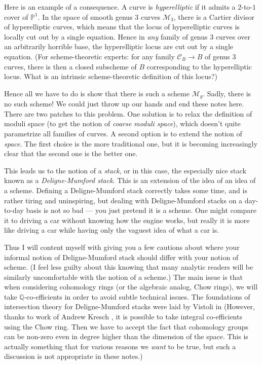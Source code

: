 \documentclass[12pt,letterpaper]{amsart}
\newcommand{\Q}{\mathbb{Q}}
\newcommand{\proj}{\mathbb P}
\newcommand{\cC}{{\mathcal{C}}}
\newcommand{\cm}{{\mathcal{M}}}
\begin{document}
{Here is an example of a consequence.  A curve is {\em hyperelliptic}
if it admits a $2$-to-$1$ cover of $\proj^1$.  In the space of smooth
genus $3$ curves $\cm_3$, there is a Cartier divisor of hyperelliptic
curves, which means that the locus of hyperelliptic curves is locally
cut out by a single equation.  Hence in {\em any} family of genus $3$
curves over an arbitrarily horrible base, the hyperelliptic locus are
cut out by a single equation.  (For scheme-theoretic experts: for any
family $\cC_B \rightarrow B$ of genus $3$ curves, there is then a
closed subscheme of $B$ corresponding to the hyperelliptic locus.
What is an intrinsic scheme-theoretic definition of this locus?)

Hence all we have to do is show that there is such a scheme $\cm_g$.
Sadly, there is no such scheme!  We could just throw up our hands and
end these notes here.  There are two patches to this problem. One
solution is to relax the definition of moduli space (to get the notion
of {\em coarse moduli space}), which doesn't quite parametrize all
families of curves.  A second option is to extend the notion of {\em
  space}.  The first choice is the more traditional one, but it is
becoming increasingly clear that the second one is the better one.

This leads us to the notion of a {\em stack}, or in this case, the
especially nice stack known as a {\em Deligne-Mumford stack}.  This is
an extension of the idea of an idea of a scheme.  Defining a
Deligne-Mumford stack correctly takes some time, and is rather tiring
and uninspiring, but dealing with Deligne-Mumford stacks on a
day-to-day basis is not so bad --- you just pretend it is a scheme.
One might compare it to driving a car without knowing how the engine
works, but really it is more like driving a car while having only the
vaguest idea of what a car is.

Thus I will content myself with giving you a few cautions about where
your informal notion of Deligne-Mumford stack should differ with your
notion of scheme.  (I feel less guilty about this knowing that many
analytic readers will be similarly uncomfortable with the notion of a
scheme.)  The main issue is that when considering
cohomology rings (or the algebraic analog, Chow rings), we will
take $\Q$-co-efficients in order to avoid subtle technical issues.
The foundations of intersection theory for Deligne-Mumford stacks
were laid by Vistoli in \cite{vistoli}
(However, thanks to work of Andrew Kresch \cite{kresch}, it
is possible to take integral co-efficients using the Chow ring.
Then we have to accept the fact that cohomology groups can be non-zero
even in degree higher than the dimension of the space.  This is actually
something that for various reasons we {\em want} to be true, but such
a discussion is not appropriate in these notes.) 

}
\end{document}
